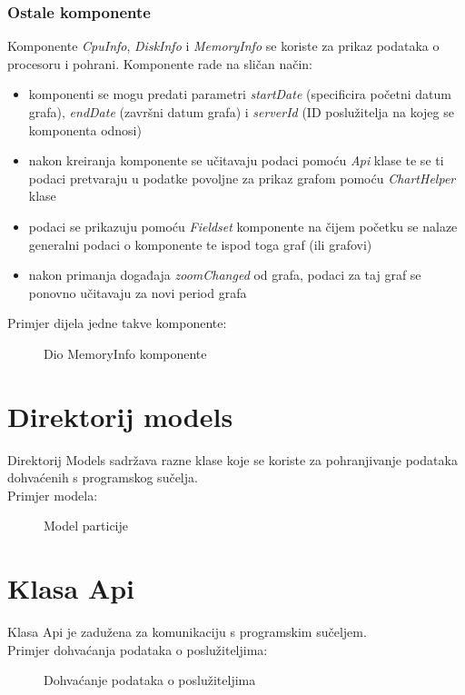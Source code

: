 \documentclass[zavrsnirad]{fer}
\begin{document}
\subsubsection{Ostale komponente}
Komponente \textit{CpuInfo}, \textit{DiskInfo} i \textit{MemoryInfo} se koriste za prikaz podataka o procesoru i pohrani. Komponente rade na sličan način:
\begin{itemize}
	\item komponenti se mogu predati parametri \textit{startDate} (specificira početni datum grafa), \textit{endDate} (završni datum grafa) i \textit{serverId} (ID poslužitelja na kojeg se komponenta odnosi)
	\item nakon kreiranja komponente se učitavaju podaci pomoću \textit{Api} klase te se ti podaci pretvaraju u podatke povoljne za prikaz grafom pomoću \textit{ChartHelper} klase
	\item podaci se prikazuju pomoću \textit{Fieldset} komponente na čijem početku se nalaze generalni podaci o komponente te ispod toga graf (ili grafovi)
	\item nakon primanja događaja \textit{zoomChanged} od grafa, podaci za taj graf se ponovno učitavaju za novi period grafa
\end{itemize}
Primjer dijela jedne takve komponente:
\begin{figure}[htb]
	\centering
	
	\caption{Dio MemoryInfo komponente}
\end{figure}
\FloatBarrier

\section{Direktorij models}
Direktorij Models sadržava razne klase koje se koriste za pohranjivanje podataka dohvaćenih s programskog sučelja.
\\Primjer modela:
\begin{figure}[htb]
	\centering
	
	\caption{Model particije}
\end{figure}
\FloatBarrier

\section{Klasa Api}
Klasa Api je zadužena za komunikaciju s programskim sučeljem.
\\Primjer dohvaćanja podataka o poslužiteljima:
\begin{figure}[htb]
	\centering
	
	\caption{Dohvaćanje podataka o poslužiteljima}
\end{figure}
\FloatBarrier
\end{document}
